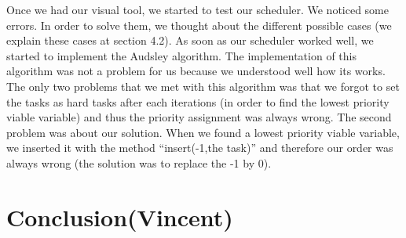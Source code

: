 \documentclass[a4paper,12pt]{article}
\begin{document}
\smallskip
\noindent
Once we had our visual tool, we started to test our scheduler. We noticed some errors. In order to solve them, we thought about the different possible cases (we explain these cases at section 4.2). As soon as our scheduler worked well, we started to implement the Audsley algorithm. The implementation of this algorithm was not a problem for us because we understood well how its works. The only two problems that we met with this algorithm was that we forgot to set the tasks as hard tasks after each iterations (in order to find the lowest priority viable variable) and thus the priority assignment was always wrong. The second problem was about our solution. When we found a lowest priority viable variable, we inserted it with the method ``insert(-1,the task)'' and therefore our order was always wrong (the solution was to replace the -1 by 0). 

\newpage

\section{Conclusion(Vincent)}
\end{document}
